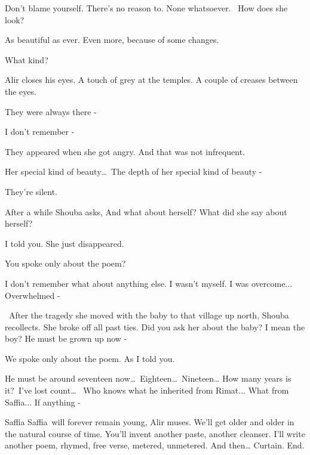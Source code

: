 \documentclass[letterpaper]{article}
\begin{document}
{\textquotedbl}Don't blame yourself. There's no reason to. None whatsoever.~ How does she look?{\textquotedbl} 

{\textquotedbl}As beautiful as ever. Even more, because of some changes.{\textquotedbl}

{\textquotedbl}What kind?{\textquotedbl} 

Alir closes his eyes. {\textquotedbl}A touch of grey at the temples. A couple of creases between the
eyes.{\textquotedbl} 

{\textquotedbl}They were always there -{\textquotedbl}~ 

{\textquotedbl}I don't remember -{\textquotedbl} 

{\textquotedbl}They appeared when she got angry. And that was not infrequent.{\textquotedbl} 

{\textquotedbl}Her special kind of beauty{\dots}\ The depth of her special kind of beauty -{\textquotedbl} 

They're silent.

After a while Shouba asks, {\textquotedbl}And what about herself? What did she say about herself?{\textquotedbl} 

{\textquotedbl}I told you. She just disappeared.{\textquotedbl} 

{\textquotedbl}You spoke only about the poem?{\textquotedbl}\ 

{\textquotedbl}I don't remember what about anything else. I wasn't myself. I was overcome... Overwhelmed
-{\textquotedbl} 

~{\textquotedbl}After the tragedy she moved with the baby to that village up north,{\textquotedbl} Shouba recollects.
{\textquotedbl}She broke off all past ties. Did you ask her about the baby? I mean the boy? He must be grown up now -
{\textquotedbl} 

{\textquotedbl}We spoke only about the poem. As I told you.{\textquotedbl} 

{\textquotedbl}He must be around seventeen now{\dots}\ Eighteen{\dots}\ Nineteen{\dots} How many years is it?\ I've lost
count{\dots} ~Who knows what he inherited from Rimat... What from Saffia... If anything -{\textquotedbl} 

{\textquotedbl}Saffia Saffia\ will forever remain young,{\textquotedbl} Alir muses. {\textquotedbl}We'll get older and
older in the natural course of time. You'll invent another paste, another cleanser. I'll write another poem, rhymed,
free verse, metered, unmetered. And then{\dots} Curtain. End.{\textquotedbl}
\end{document}
